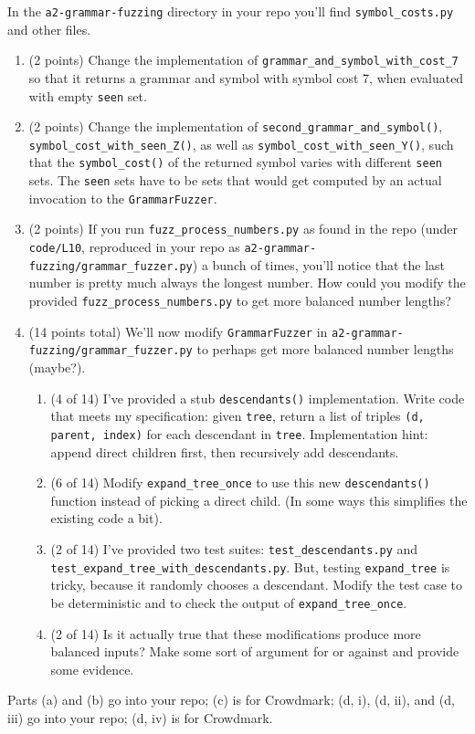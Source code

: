 In the \texttt{a2-grammar-fuzzing} directory in your repo you'll find \texttt{symbol\_costs.py} and other files.
\begin{enumerate}[label=(\alph*)]
\item (2 points) Change the implementation of \texttt{grammar\_and\_symbol\_with\_cost\_7} so that it returns a grammar and symbol with symbol cost 7, when evaluated with empty \texttt{seen} set.
\item (2 points) Change the implementation of \texttt{second\_grammar\_and\_symbol()}, \texttt{symbol\_cost\_with\_seen\_Z()}, as well as \texttt{symbol\_cost\_with\_seen\_Y()}, such that the \texttt{symbol\_cost()} of the returned symbol varies with different \texttt{seen} sets. The \texttt{seen} sets have to be sets that would get computed by an actual invocation to the \texttt{GrammarFuzzer}.
\item (2 points) If you run \texttt{fuzz\_process\_numbers.py} as found in the repo (under \texttt{code/L10}, reproduced in your repo as \texttt{a2-grammar-fuzzing/grammar\_fuzzer.py})
  a bunch of times, you'll notice that the last number is pretty much always the longest number. 
  How could you modify the provided \texttt{fuzz\_process\_numbers.py} to get more balanced number lengths?
\item (14 points total) We'll now modify \texttt{GrammarFuzzer} in \texttt{a2-grammar-fuzzing/grammar\_fuzzer.py} to perhaps get more
balanced number lengths (maybe?).
\begin{enumerate}[label=(\roman*)]
\item (4 of 14) I've provided a stub \texttt{descendants()} implementation.
Write code that meets my specification: given \texttt{tree}, return a list of triples
\texttt{(d, parent, index)} for each descendant in \texttt{tree}. Implementation hint: append direct children
first, then recursively add descendants.
\item (6 of 14) Modify \texttt{expand\_tree\_once} to use this new
\texttt{descendants()} function instead of picking a direct child. (In some ways this simplifies the existing
code a bit).
\item (2 of 14) I've provided two test suites: \texttt{test\_descendants.py} and \texttt{test\_expand\_tree\_with\_descendants.py}. But, testing \texttt{expand\_tree} is tricky, because it randomly chooses a descendant. Modify the test case to be deterministic and to check the output of \texttt{expand\_tree\_once}.
\item (2 of 14) Is it actually true that these modifications produce more balanced inputs? Make some sort of argument for or against and provide some evidence.
\end{enumerate}
\end{enumerate}

Parts (a) and (b) go into your repo; (c) is for Crowdmark; (d, i), (d, ii), and (d, iii) go into your repo; (d, iv)
is for Crowdmark.

